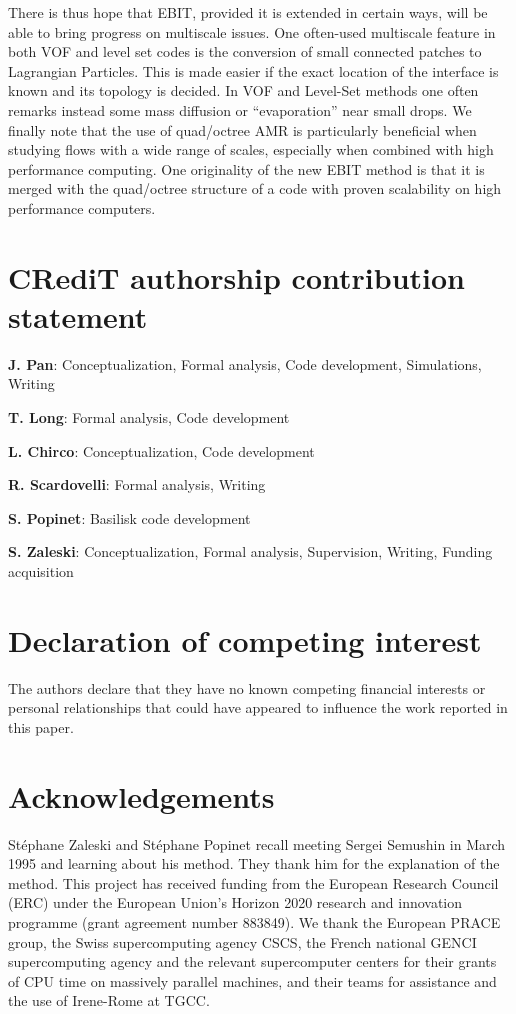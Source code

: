 \documentclass[preprint, 12pt]{elsarticle}
\begin{document}
There is thus hope that EBIT, provided it is extended in certain ways, will be able to bring progress on multiscale issues. One often-used multiscale feature in both VOF and level set codes is the conversion of small connected patches to Lagrangian Particles. This is made easier if the exact location of the interface is known and its topology is decided. In VOF and Level-Set methods one often remarks instead some mass diffusion or ``evaporation'' near small drops. We finally note that the use of quad/octree AMR is particularly beneficial when studying flows with a wide range of scales, especially when combined with high performance computing. One originality of the new EBIT method is that it is merged with the quad/octree structure of a code with proven scalability on high performance computers.


\section{CRediT authorship contribution statement}

\textbf{J. Pan}: Conceptualization, Formal analysis, Code development, Simulations, Writing

\textbf{T. Long}: Formal analysis, Code development

\textbf{L. Chirco}: Conceptualization, Code development

\textbf{R. Scardovelli}: Formal analysis, Writing

\textbf{S. Popinet}: Basilisk code development

\textbf{S. Zaleski}: Conceptualization, Formal analysis, Supervision, Writing, Funding acquisition

\section{Declaration of competing interest}
The authors declare that they have no known competing financial interests or personal relationships that could have appeared to influence the work reported in this paper.


\section{Acknowledgements}
St\'{e}phane Zaleski and St\'{e}phane Popinet recall meeting Sergei Semushin in March 1995 and learning about his method. They thank him for the explanation of the method.
This project has received funding from the European Research Council (ERC) under the European Union's Horizon 2020 research and innovation programme (grant agreement number 883849). We thank the European PRACE group, the Swiss supercomputing agency CSCS, the French national GENCI supercomputing agency and the relevant supercomputer centers for their grants of CPU time on massively parallel machines, and their teams for assistance and the use of Irene-Rome at TGCC.
\end{document}

